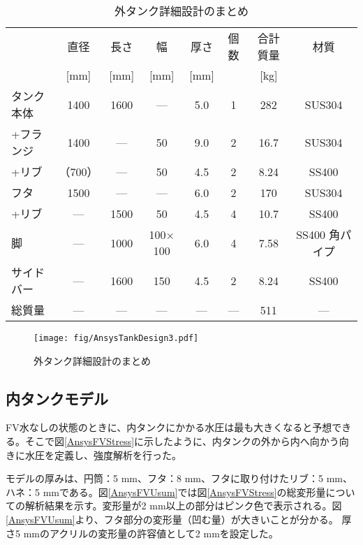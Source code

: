\documentclass[11pt]{jreport}
\newcommand{\figref}[1]{図\ref{#1}}
\begin{document}
\begin{table}[!h]
\caption[外タンク詳細設計のまとめ]{外タンク詳細設計のまとめ}
\begin{center}
\begin{tabular}{lccccccc}
\hline \hline
& 直径 & 長さ & 幅 & 厚さ & 個数 & 合計質量 & 材質 \\
& [mm] & [mm] & [mm] & [mm] &  & [kg] &  \\
\hline
タンク本体 & 1400 & 1600 & --- & 5.0 & 1 & 282 &  SUS304\\
+フランジ & 1400 & --- & 50 & 9.0 & 2 & 16.7 & SUS304\\
+リブ & （700）& --- & 50 & 4.5 & 2 & 8.24 &SS400\\
\hline
フタ & 1500 & --- & --- & 6.0 & 2 & 170 & SUS304 \\
+リブ & --- & 1500 & 50 & 4.5 & 4 & 10.7& SS400\\
\hline
脚 & --- & 1000 & 100$\times$100 & 6.0 & 4 & 7.58 & SS400 角パイプ\\
サイドバー & --- & 1600 & 150 & 4.5 & 2 & 8.24 & SS400\\
\hline
総質量 & --- & --- & --- & --- & --- & 511 & ---\\
\hline \hline
\end{tabular}
\end{center}
\label{TableAnsysTankDesign}
\end{table}%

\begin{figure}[!h]
\centering
\texttt{[image: fig/AnsysTankDesign3.pdf]}
\caption[外タンク詳細設計のまとめ]{外タンク詳細設計のまとめ}
\label{AnsysTankDesign}
\end{figure}

\subsection{内タンクモデル}
FV水なしの状態のときに、内タンクにかかる水圧は最も大きくなると予想できる。そこで\figref{AnsysFVStress}に示したように、内タンクの外から内へ向かう向きに水圧を定義し、強度解析を行った。

モデルの厚みは、円筒：5 mm、フタ：8 mm、フタに取り付けたリブ：5 mm、ハネ：5 mmである。\figref{AnsysFVUsum}では\figref{AnsysFVStress}の総変形量についての解析結果を示す。変形量が2 mm以上の部分はピンク色で表示される。\figref{AnsysFVUsum}より、フタ部分の変形量（凹む量）が大きいことが分かる。
厚さ5 mmのアクリルの変形量の許容値として2 mmを設定した。
\end{document}
